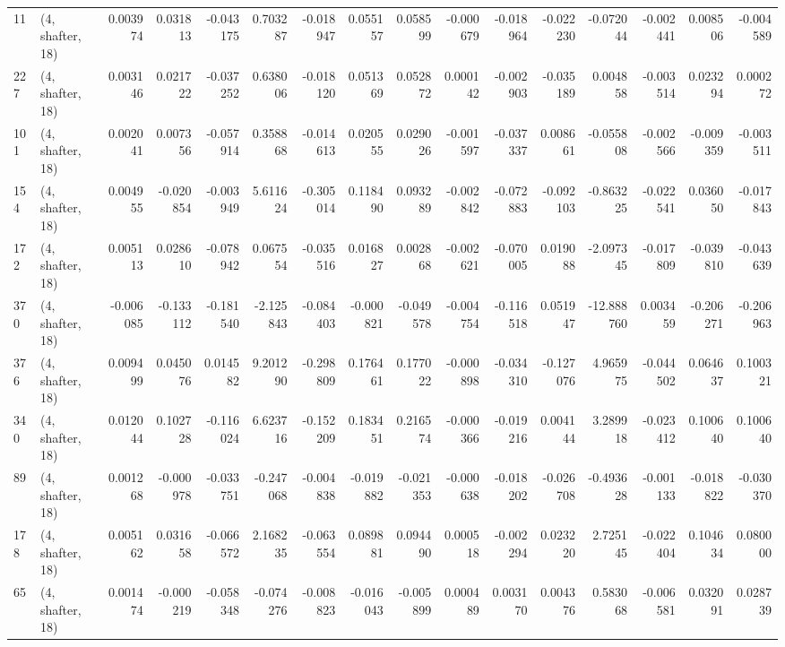 \begin{tabular}{llrrrrrrrrrrrrrr}
11  &  (4, shafter, 18) &   0.003974 &  0.031813 & -0.043175 &    0.703287 & -0.018947 &   0.055157 &  0.058599 & -0.000679 & -0.018964 & -0.022230 &   -0.072044 & -0.002441 &  0.008506 & -0.004589 \\
227 &  (4, shafter, 18) &   0.003146 &  0.021722 & -0.037252 &    0.638006 & -0.018120 &   0.051369 &  0.052872 &  0.000142 & -0.002903 & -0.035189 &    0.004858 & -0.003514 &  0.023294 &  0.000272 \\
101 &  (4, shafter, 18) &   0.002041 &  0.007356 & -0.057914 &    0.358868 & -0.014613 &   0.020555 &  0.029026 & -0.001597 & -0.037337 &  0.008661 &   -0.055808 & -0.002566 & -0.009359 & -0.003511 \\
154 &  (4, shafter, 18) &   0.004955 & -0.020854 & -0.003949 &    5.611624 & -0.305014 &   0.118490 &  0.093289 & -0.002842 & -0.072883 & -0.092103 &   -0.863225 & -0.022541 &  0.036050 & -0.017843 \\
172 &  (4, shafter, 18) &   0.005113 &  0.028610 & -0.078942 &    0.067554 & -0.035516 &   0.016827 &  0.002868 & -0.002621 & -0.070005 &  0.019088 &   -2.097345 & -0.017809 & -0.039810 & -0.043639 \\
370 &  (4, shafter, 18) &  -0.006085 & -0.133112 & -0.181540 &   -2.125843 & -0.084403 &  -0.000821 & -0.049578 & -0.004754 & -0.116518 &  0.051947 &  -12.888760 &  0.003459 & -0.206271 & -0.206963 \\
376 &  (4, shafter, 18) &   0.009499 &  0.045076 &  0.014582 &    9.201290 & -0.298809 &   0.176461 &  0.177022 & -0.000898 & -0.034310 & -0.127076 &    4.965975 & -0.044502 &  0.064637 &  0.100321 \\
340 &  (4, shafter, 18) &   0.012044 &  0.102728 & -0.116024 &    6.623716 & -0.152209 &   0.183451 &  0.216574 & -0.000366 & -0.019216 &  0.004144 &    3.289918 & -0.023412 &  0.100640 &  0.100640 \\
89  &  (4, shafter, 18) &   0.001268 & -0.000978 & -0.033751 &   -0.247068 & -0.004838 &  -0.019882 & -0.021353 & -0.000638 & -0.018202 & -0.026708 &   -0.493628 & -0.001133 & -0.018822 & -0.030370 \\
178 &  (4, shafter, 18) &   0.005162 &  0.031658 & -0.066572 &    2.168235 & -0.063554 &   0.089881 &  0.094490 &  0.000518 & -0.002294 &  0.023220 &    2.725145 & -0.022404 &  0.104634 &  0.080000 \\
65  &  (4, shafter, 18) &   0.001474 & -0.000219 & -0.058348 &   -0.074276 & -0.008823 &  -0.016043 & -0.005899 &  0.000489 &  0.003170 &  0.004376 &    0.583068 & -0.006581 &  0.032091 &  0.028739 \\

\end{tabular}
